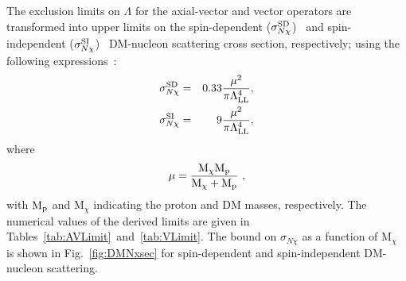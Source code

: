 {{{The exclusion limits on $\Lambda$ for the axial-vector and vector operators are transformed into upper limits on
the spin-dependent ($\sigma^{\rm SD}_{N\chi}$)~\cite{Super-Kamiokande,
  IceCube, COUPP, SIMPLE, Amole:2015lsj, Archambault:2012pm, Aprile:2013doa} and spin-independent
($\sigma^{\rm SI}_{N\chi}$)~\cite{SIMPLE, COUPP, CDMS-II, SuperCDMS, XENON100, LUX, Angloher:2014myn, Angloher:2015ewa}
DM-nucleon scattering cross section, respectively; using the following
expressions~\cite{PhysRevD.85.056011}:
\begin{eqnarray}
\sigma_{N\chi}^{\rm SD}  & = &  0.33 \frac{\mu^{2}}{\pi\Lambda_{\rm LL}^{4}}, \\
\sigma_{N\chi}^{\rm SI}  & = &  9 \frac{\mu^2}{\pi\Lambda_{\rm LL}^{4}},
\end{eqnarray}
where 
\begin{equation}
\mu = \frac{\mathrm{M}_{\chi}\mathrm{M}_{\rm
    p}}{\mathrm{M}_{\chi}+\mathrm{M}_{\rm p}}~,
\end{equation}
with $\mathrm{M}_{\rm p}$ and $\mathrm{M}_\chi$ indicating the proton and
DM masses, respectively. The numerical values of the derived limits
are given in Tables~\ref{tab:AVLimit}~and~\ref{tab:VLimit}.  The
bound on $\sigma_{N\chi}$ as a function of $\mathrm{M}_\chi$ is shown
in Fig.~\ref{fig:DMNxsec} for spin-dependent and spin-independent DM-nucleon scattering.

}}}
